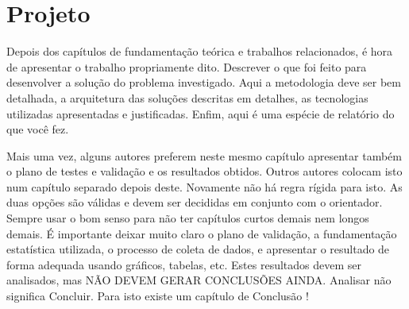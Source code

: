 
\chapter{Projeto}
\label{ch:projeto}

Depois dos capítulos de fundamentação teórica e trabalhos relacionados, é hora de apresentar o trabalho propriamente dito. Descrever o que foi feito para desenvolver a solução do problema investigado. Aqui a metodologia deve ser bem detalhada, a arquitetura das soluções descritas em detalhes, as tecnologias utilizadas apresentadas e justificadas. Enfim, aqui é uma espécie de relatório do que você fez. 

Mais uma vez, alguns autores preferem neste mesmo capítulo apresentar também o plano de testes e validação e os resultados obtidos. Outros autores colocam isto num capítulo separado depois deste. Novamente não há regra rígida para isto. As duas opções são válidas e devem ser decididas em conjunto com o orientador. Sempre usar o bom senso para não ter capítulos curtos demais nem longos demais. É importante deixar muito claro o plano de validação, a fundamentação estatística utilizada, o processo de coleta de dados, e apresentar o resultado de forma adequada usando gráficos, tabelas, etc. Estes resultados devem ser analisados, mas NÃO DEVEM GERAR CONCLUSÕES AINDA. Analisar não significa Concluir. Para isto existe um capítulo de Conclusão ! 